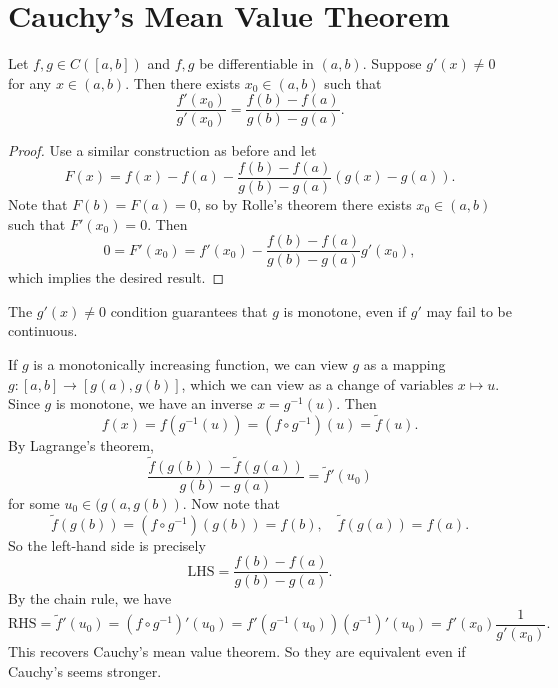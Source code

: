 \section{Cauchy's Mean Value Theorem}
\begin{theorem}
  Let $f, g \in C([a, b])$ and $f, g$ be differentiable
  in $(a, b)$. Suppose $g'(x) \ne 0$ for any
  $x \in (a, b)$. Then there exists $x_0 \in (a, b)$
  such that
  \[
    \frac{f'(x_0)}{g'(x_0)} = \frac{f(b) - f(a)}{g(b) - g(a)}.
  \]
\end{theorem}

\begin{proof}
  Use a similar construction as before and let
  \[
    F(x) = f(x) - f(a) - \frac{f(b) - f(a)}{g(b) - g(a)} (g(x) - g(a)).
  \]
  Note that $F(b) = F(a) = 0$, so by Rolle's theorem
  there exists $x_0 \in (a, b)$ such that
  $F'(x_0) = 0$. Then
  \[0 = F'(x_0) = f'(x_0) - \frac{f(b) - f(a)}{g(b) - g(a)} g'(x_0),\]
  which implies the desired result.
\end{proof}

\begin{remark}
  The $g'(x) \ne 0$ condition guarantees that
  $g$ is monotone, even if $g'$ may fail to be
  continuous.
\end{remark}

\begin{remark}
  If $g$ is a monotonically increasing function,
  we can view $g$ as a mapping
  $g : [a, b] \to [g(a), g(b)]$, which we can view
  as a change of variables $x \mapsto u$. Since $g$ is
  monotone, we have an inverse $x = g^{-1}(u)$. Then
  \[f(x) = f(g^{-1}(u)) = (f \circ g^{-1})(u) = \widetilde{f}(u).\]
  By Lagrange's theorem,
  \[
  \frac{\widetilde{f}(g(b)) - \widetilde{f}(g(a))}{g(b) - g(a)}
    = \widetilde{f}'(u_0)
  \]
  for some $u_0 \in (g(a, g(b))$. Now note that
  \[
    \widetilde{f}(g(b)) = (f \circ g^{-1})(g(b)) = f(b),
    \quad \widetilde{f}(g(a)) = f(a).
  \]
  So the left-hand side is precisely
  \[
    \text{LHS} = \frac{f(b) - f(a)}{g(b) - g(a)}.
  \]
  By the chain rule, we have
  \[
    \text{RHS} = \widetilde{f}'(u_0) = (f \circ g^{-1})'(u_0)
    = f'(g^{-1}(u_0)) (g^{-1})'(u_0)
    = f'(x_0) \frac{1}{g'(x_0)}.
  \]
  This recovers Cauchy's mean value theorem. So they are
  equivalent even if Cauchy's seems stronger.
\end{remark}
